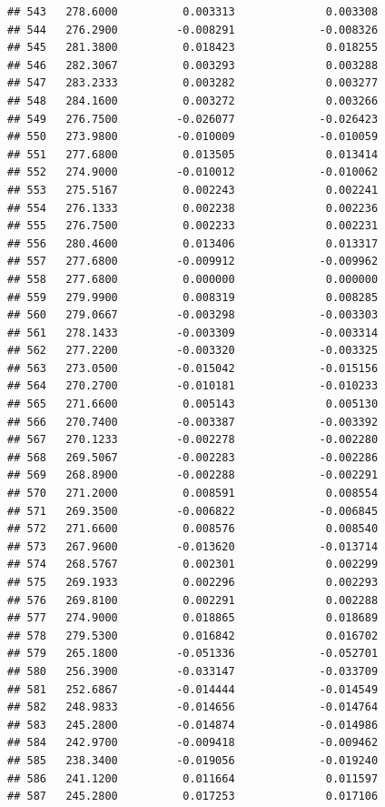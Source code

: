 \documentclass[
]{article}
\begin{document}
\begin{verbatim}
## 543   278.6000          0.003313              0.003308
## 544   276.2900         -0.008291             -0.008326
## 545   281.3800          0.018423              0.018255
## 546   282.3067          0.003293              0.003288
## 547   283.2333          0.003282              0.003277
## 548   284.1600          0.003272              0.003266
## 549   276.7500         -0.026077             -0.026423
## 550   273.9800         -0.010009             -0.010059
## 551   277.6800          0.013505              0.013414
## 552   274.9000         -0.010012             -0.010062
## 553   275.5167          0.002243              0.002241
## 554   276.1333          0.002238              0.002236
## 555   276.7500          0.002233              0.002231
## 556   280.4600          0.013406              0.013317
## 557   277.6800         -0.009912             -0.009962
## 558   277.6800          0.000000              0.000000
## 559   279.9900          0.008319              0.008285
## 560   279.0667         -0.003298             -0.003303
## 561   278.1433         -0.003309             -0.003314
## 562   277.2200         -0.003320             -0.003325
## 563   273.0500         -0.015042             -0.015156
## 564   270.2700         -0.010181             -0.010233
## 565   271.6600          0.005143              0.005130
## 566   270.7400         -0.003387             -0.003392
## 567   270.1233         -0.002278             -0.002280
## 568   269.5067         -0.002283             -0.002286
## 569   268.8900         -0.002288             -0.002291
## 570   271.2000          0.008591              0.008554
## 571   269.3500         -0.006822             -0.006845
## 572   271.6600          0.008576              0.008540
## 573   267.9600         -0.013620             -0.013714
## 574   268.5767          0.002301              0.002299
## 575   269.1933          0.002296              0.002293
## 576   269.8100          0.002291              0.002288
## 577   274.9000          0.018865              0.018689
## 578   279.5300          0.016842              0.016702
## 579   265.1800         -0.051336             -0.052701
## 580   256.3900         -0.033147             -0.033709
## 581   252.6867         -0.014444             -0.014549
## 582   248.9833         -0.014656             -0.014764
## 583   245.2800         -0.014874             -0.014986
## 584   242.9700         -0.009418             -0.009462
## 585   238.3400         -0.019056             -0.019240
## 586   241.1200          0.011664              0.011597
## 587   245.2800          0.017253              0.017106

\end{verbatim}
\end{document}

